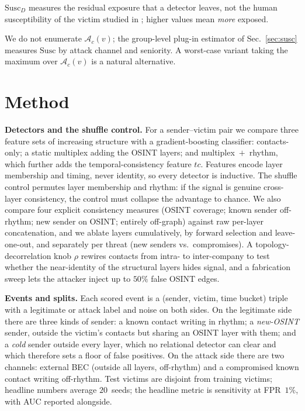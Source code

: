 \documentclass[conference]{IEEEtran}
\begin{document}
\noindent $\mathrm{Susc}_D$ measures the residual exposure that a detector leaves, not the human
susceptibility of the victim studied in \cite{halevi2015spearphishing,butavicius2022why}; higher values mean
\emph{more} exposed.

\noindent We do not enumerate $\mathcal{A}_c(v)$; the group-level plug-in estimator of Sec.~\ref{sec:susc}
measures $\mathrm{Susc}$ by attack channel and seniority. A worst-case variant taking the maximum over
$\mathcal{A}_c(v)$ is a natural alternative.

\section{Method}
\label{sec:method}
\textbf{Detectors and the shuffle control.} For a sender--victim pair we compare three feature sets of
increasing structure with a gradient-boosting classifier: contacts-only; a static multiplex adding the OSINT
layers; and multiplex~$+$~rhythm, which further adds the temporal-consistency feature $tc$. Features encode
layer membership and timing, never identity, so every detector is inductive. The shuffle control permutes layer
membership and rhythm: if the signal is genuine cross-layer consistency, the control must collapse the
advantage to chance. We also compare four explicit consistency measures (OSINT coverage; known sender
off-rhythm; new sender on OSINT; entirely off-graph) against raw per-layer concatenation, and we ablate layers
cumulatively, by forward selection and leave-one-out, and separately per threat (new senders vs.\
compromises). A topology-decorrelation knob $\rho$ rewires contacts from intra- to inter-company to test whether
the near-identity of the structural layers hides signal, and a fabrication sweep lets the attacker inject up to
$50\%$ false OSINT edges.

\textbf{Events and splits.} Each scored event is a (sender, victim, time bucket) triple with a legitimate or
attack label and noise on both sides. On the legitimate side there are three kinds of sender: a known
contact writing in rhythm; a \emph{new-OSINT} sender, outside the victim's contacts but sharing an OSINT
layer with them; and a \emph{cold} sender outside every layer, which no relational detector can clear and
which therefore sets a floor of false positives. On the attack side there are two channels: external BEC
(outside all layers, off-rhythm) and a compromised known contact writing off-rhythm. Test victims are
disjoint from training victims; headline numbers average $20$~seeds; the headline metric is sensitivity at
FPR~$1\%$, with AUC reported alongside.
\end{document}
